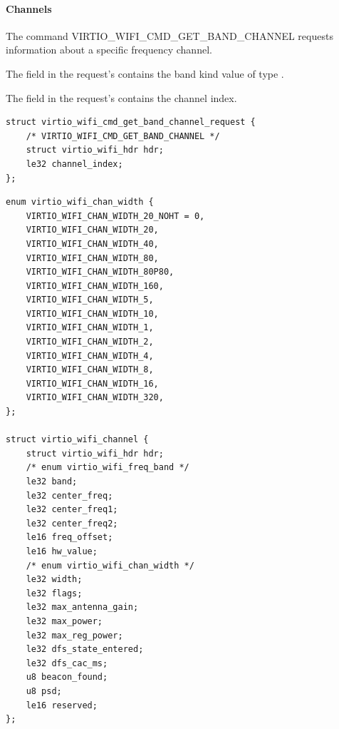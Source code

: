 
\paragraph{Channels}\label{sec:Device Types / 802.11 Device / Device Operation / Querying Physical Properties / Channels}

The command VIRTIO_WIFI_CMD_GET_BAND_CHANNEL requests information about a specific frequency channel.

The field  in the request's  contains the band kind value of type .

The field  in the request's  contains the channel index.

\begin{lstlisting}
struct virtio_wifi_cmd_get_band_channel_request {
	/* VIRTIO_WIFI_CMD_GET_BAND_CHANNEL */
	struct virtio_wifi_hdr hdr;
	le32 channel_index;
};
\end{lstlisting}

\begin{lstlisting}
enum virtio_wifi_chan_width {
	VIRTIO_WIFI_CHAN_WIDTH_20_NOHT = 0,
	VIRTIO_WIFI_CHAN_WIDTH_20,
	VIRTIO_WIFI_CHAN_WIDTH_40,
	VIRTIO_WIFI_CHAN_WIDTH_80,
	VIRTIO_WIFI_CHAN_WIDTH_80P80,
	VIRTIO_WIFI_CHAN_WIDTH_160,
	VIRTIO_WIFI_CHAN_WIDTH_5,
	VIRTIO_WIFI_CHAN_WIDTH_10,
	VIRTIO_WIFI_CHAN_WIDTH_1,
	VIRTIO_WIFI_CHAN_WIDTH_2,
	VIRTIO_WIFI_CHAN_WIDTH_4,
	VIRTIO_WIFI_CHAN_WIDTH_8,
	VIRTIO_WIFI_CHAN_WIDTH_16,
	VIRTIO_WIFI_CHAN_WIDTH_320,
};

struct virtio_wifi_channel {
	struct virtio_wifi_hdr hdr;
	/* enum virtio_wifi_freq_band */
	le32 band;
	le32 center_freq;
	le32 center_freq1;
	le32 center_freq2;
	le16 freq_offset;
	le16 hw_value;
	/* enum virtio_wifi_chan_width */
	le32 width;
	le32 flags;
	le32 max_antenna_gain;
	le32 max_power;
	le32 max_reg_power;
	le32 dfs_state_entered;
	le32 dfs_cac_ms;
	u8 beacon_found;
	u8 psd;
	le16 reserved;
};
\end{lstlisting}


